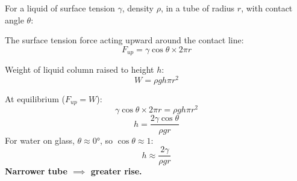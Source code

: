 \begin{processbox}
For a liquid of surface tension $\gamma$, density
$\rho$, in a tube of radius $r$, with contact angle
$\theta$:

The surface tension force acting upward around the
contact line:
\[
  F_{up} = \gamma \cos\theta \times 2\pi r
\]

Weight of liquid column raised to height $h$:
\[
  W = \rho g h \pi r^2
\]

At equilibrium ($F_{up} = W$):
\[
  \gamma \cos\theta \times 2\pi r = \rho g h \pi r^2
\]
\[
  \boxed{h = \frac{2\gamma\cos\theta}{\rho g r}}
\]
For water on glass, $\theta \approx 0°$,
so $\cos\theta \approx 1$:
\[
  h \approx \frac{2\gamma}{\rho g r}
\]
\textbf{Narrower tube $\implies$ greater rise.}
\end{processbox}


